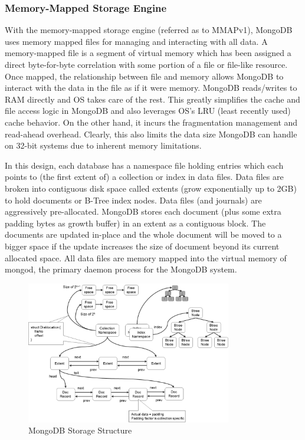 \documentclass[11pt]{book}
\begin{document}
\subsubsection{Memory-Mapped Storage Engine}
With the memory-mapped storage engine (referred as to MMAPv1), MongoDB uses memory mapped files for managing and interacting with all data. A memory-mapped file is a segment of virtual memory which has been assigned a direct byte-for-byte correlation with some portion of a file or file-like resource. Once mapped, the relationship between file and memory allows MongoDB to interact with the data in the file as if it were memory.
MongoDB reads/writes to RAM directly and OS takes care of the rest. This greatly simplifies the cache and file access logic in MongoDB and also leverages OS's LRU (least recently used) cache behavior. On the other hand, it incurs the fragmentation management and read-ahead overhead. Clearly, this also limits the data size MongoDB can handle on 32-bit systems due to inherent memory limitations.

In this design, each database has a namespace file holding entries which each points to (the first extent of) a collection or index in data files. Data files are broken into contiguous disk space called extents (grow exponentially up to 2GB) to hold documents or B-Tree index nodes. Data files (and journals) are aggressively pre-allocated. MongoDB stores each document (plus some extra padding bytes as growth buffer) in an extent as a contiguous block. The documents are updated in-place and the whole document will be moved to a bigger space if the update increases the size of document beyond its current allocated space. All data files are memory mapped into the virtual memory of mongod, the primary daemon process for the MongoDB system.

\begin{figure}[t]
\includegraphics[width=0.8\textwidth]{images/mongodb-storage-structure.png}
\centering
\caption{MongoDB Storage Structure}
\end{figure}
\end{document}
